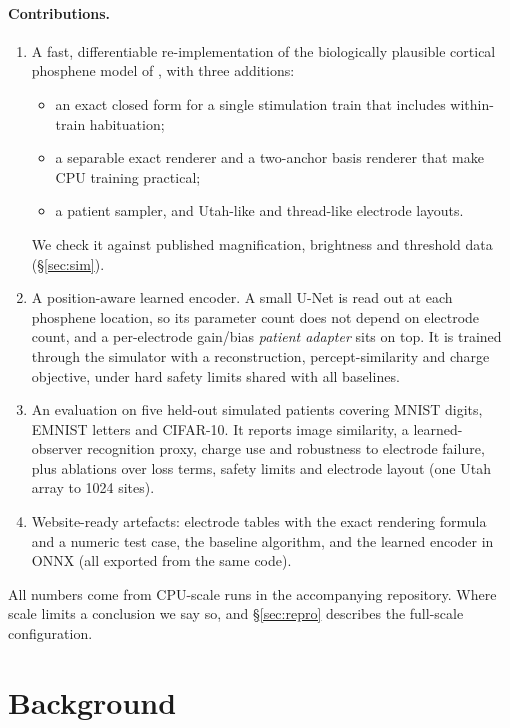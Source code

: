 \paragraph{Contributions.}
\begin{enumerate}
\item A fast, differentiable re-implementation of the biologically plausible cortical phosphene model of \citet{vandergrinten2024towards}, with three additions:
  \begin{itemize}
  \item an exact closed form for a single stimulation train that includes within-train habituation;
  \item a separable exact renderer and a two-anchor basis renderer that make CPU training practical;
  \item a patient sampler, and Utah-like and thread-like electrode layouts.
  \end{itemize}
  We check it against published magnification, brightness and threshold data (\S\ref{sec:sim}).
\item A position-aware learned encoder. A small U-Net is read out at each phosphene location, so its parameter count does not depend on electrode count, and a per-electrode gain/bias \emph{patient adapter} sits on top. It is trained through the simulator with a reconstruction, percept-similarity and charge objective, under hard safety limits shared with all baselines.
\item An evaluation on five held-out simulated patients covering MNIST digits, EMNIST letters and CIFAR-10. It reports image similarity, a learned-observer recognition proxy, charge use and robustness to electrode failure, plus ablations over loss terms, safety limits and electrode layout (one Utah array to 1024 sites).
\item Website-ready artefacts: electrode tables with the exact rendering formula and a numeric test case, the baseline algorithm, and the learned encoder in ONNX (all exported from the same code).
\end{enumerate}
All numbers come from CPU-scale runs in the accompanying repository. Where scale limits a conclusion we say so, and \S\ref{sec:repro} describes the full-scale configuration.

\section{Background}
